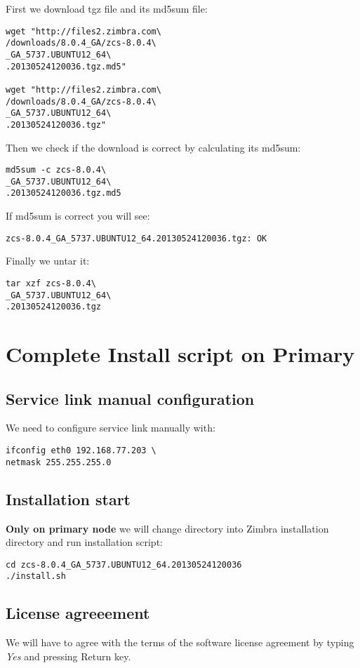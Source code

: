 First we download tgz file and its md5sum file:
\begin{verbatim}
wget "http://files2.zimbra.com\
/downloads/8.0.4_GA/zcs-8.0.4\
_GA_5737.UBUNTU12_64\
.20130524120036.tgz.md5"

wget "http://files2.zimbra.com\
/downloads/8.0.4_GA/zcs-8.0.4\
_GA_5737.UBUNTU12_64\
.20130524120036.tgz"
\end{verbatim}
Then we check if the download is correct by calculating its md5sum:
\begin{verbatim}
md5sum -c zcs-8.0.4\
_GA_5737.UBUNTU12_64\
.20130524120036.tgz.md5
\end{verbatim}
If md5sum is correct you will see:
\begin{verbatim}
zcs-8.0.4_GA_5737.UBUNTU12_64.20130524120036.tgz: OK
\end{verbatim}
Finally we untar it:
\begin{verbatim}
tar xzf zcs-8.0.4\
_GA_5737.UBUNTU12_64\
.20130524120036.tgz
\end{verbatim}

\section {\label{sec:complete-install-script-on-primary}Complete Install script on Primary}
\subsection {Service link manual configuration}
We need to configure service link manually with:
\begin{verbatim}
ifconfig eth0 192.168.77.203 \
netmask 255.255.255.0
\end{verbatim}

\subsection {Installation start}
\textbf{Only on primary node} we will change directory into Zimbra installation directory and run installation script:

\begin{verbatim}
cd zcs-8.0.4_GA_5737.UBUNTU12_64.20130524120036
./install.sh
\end{verbatim}
\subsection {License agreeement}
We will have to agree with the terms of the software license agreement by typing \textit{Yes} and pressing Return key.

